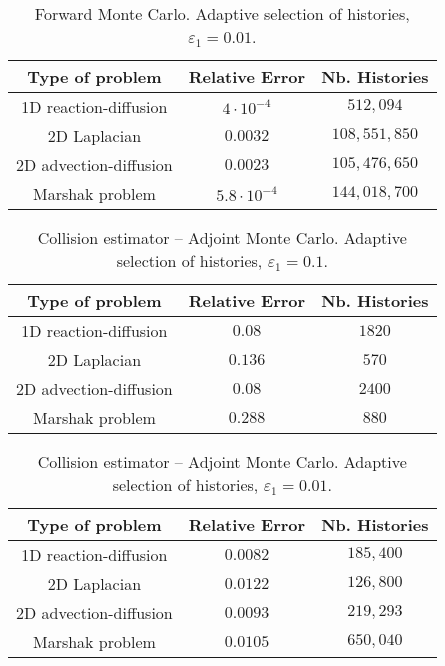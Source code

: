 \documentclass[final,leqno,onefignum,onetabnum]{siamltex1213}
\begin{document}
\begin{table}[!t]
\centering
\begin{tabular}{|c|c|c|}
\hline
\textbf{Type of problem} & \textbf{Relative Error} &\textbf{Nb. Histories}\\
\hline
1D reaction-diffusion & $4\cdot 10^{-4}$ & $512,094$\\
\hline
2D Laplacian & $0.0032$ & $108,551,850$\\
\hline
2D advection-diffusion & $0.0023$  & $105,476,650$\\
\hline
Marshak problem & $5.8 \cdot 10^{-4}$ & $144,018,700$\\
\hline
\end{tabular}
\caption{Forward Monte Carlo. Adaptive selection of histories,
$\varepsilon_1=0.01$.}
\label{tab:For_adapt2}
\end{table}


\begin{table}[!t]
\centering
\begin{tabular}{|c|c|c|}
\hline
\textbf{Type of problem} & \textbf{Relative Error} &\textbf{Nb. Histories}\\
\hline
1D reaction-diffusion & $0.08$ & $1820$\\
\hline
2D Laplacian & $0.136$ & $570$\\
\hline
2D advection-diffusion & $0.08$  & $2400$\\
\hline
Marshak problem & $0.288$ & $880$\\
\hline
\end{tabular}
\caption{Collision estimator -- Adjoint Monte Carlo. Adaptive selection of histories,
$\varepsilon_1=0.1$.}
\label{tab:Adj_adapt}
\end{table}

\begin{table}[!t]
\centering
\begin{tabular}{|c|c|c|}
\hline
\textbf{Type of problem} & \textbf{Relative Error} &\textbf{Nb. Histories}\\
\hline
1D reaction-diffusion & $0.0082$ & $185,400$\\
\hline
2D Laplacian & $0.0122$ & $126,800$\\
\hline
2D advection-diffusion & $0.0093$  & $219,293$\\
\hline
Marshak problem & $0.0105$ & $650,040$\\
\hline
\end{tabular}
\caption{Collision estimator -- Adjoint Monte Carlo. Adaptive selection of histories,
$\varepsilon_1=0.01$.}
\label{tab:Adj_adapt2}
\end{table}
\end{document}
